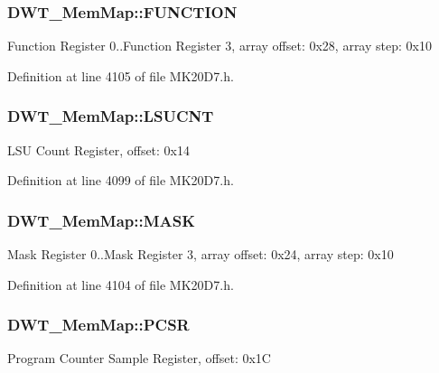 \subsubsection[{\texorpdfstring{F\+U\+N\+C\+T\+I\+ON}{FUNCTION}}]{ D\+W\+T\+\_\+\+Mem\+Map\+::\+F\+U\+N\+C\+T\+I\+ON}\hypertarget{struct_d_w_t___mem_map_ad60c09cefe311e7809d9a57fad402f5c}{}\label{struct_d_w_t___mem_map_ad60c09cefe311e7809d9a57fad402f5c}
Function Register 0..Function Register 3, array offset\+: 0x28, array step\+: 0x10 

Definition at line 4105 of file M\+K20\+D7.\+h.

\subsubsection[{\texorpdfstring{L\+S\+U\+C\+NT}{LSUCNT}}]{ D\+W\+T\+\_\+\+Mem\+Map\+::\+L\+S\+U\+C\+NT}\hypertarget{struct_d_w_t___mem_map_a748bc2765a5d7f9813e099dcfdf55980}{}\label{struct_d_w_t___mem_map_a748bc2765a5d7f9813e099dcfdf55980}
L\+SU Count Register, offset\+: 0x14 

Definition at line 4099 of file M\+K20\+D7.\+h.

\subsubsection[{\texorpdfstring{M\+A\+SK}{MASK}}]{ D\+W\+T\+\_\+\+Mem\+Map\+::\+M\+A\+SK}\hypertarget{struct_d_w_t___mem_map_a34e5e25a9ec81fc61eca09c6d6adadfa}{}\label{struct_d_w_t___mem_map_a34e5e25a9ec81fc61eca09c6d6adadfa}
Mask Register 0..Mask Register 3, array offset\+: 0x24, array step\+: 0x10 

Definition at line 4104 of file M\+K20\+D7.\+h.

\subsubsection[{\texorpdfstring{P\+C\+SR}{PCSR}}]{ D\+W\+T\+\_\+\+Mem\+Map\+::\+P\+C\+SR}\hypertarget{struct_d_w_t___mem_map_a58d461cd26674ff3bce87778c4b54164}{}\label{struct_d_w_t___mem_map_a58d461cd26674ff3bce87778c4b54164}
Program Counter Sample Register, offset\+: 0x1C 

